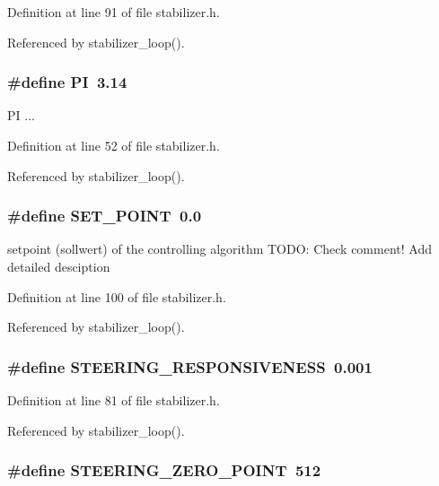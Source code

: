 Definition at line 91 of file stabilizer.h.

Referenced by stabilizer\_\-loop().
\subsubsection{\setlength{\rightskip}{0pt plus 5cm}\#define PI~3.14}\label{stabilizer_8h_598a3330b3c21701223ee0ca14316eca}


PI ... 

Definition at line 52 of file stabilizer.h.

Referenced by stabilizer\_\-loop().
\subsubsection{\setlength{\rightskip}{0pt plus 5cm}\#define SET\_\-POINT~0.0}\label{stabilizer_8h_513c42d8dbcacf9f9f7dde6914a496f5}


setpoint (sollwert) of the controlling algorithm TODO: Check comment! Add detailed desciption 

Definition at line 100 of file stabilizer.h.

Referenced by stabilizer\_\-loop().
\subsubsection{\setlength{\rightskip}{0pt plus 5cm}\#define STEERING\_\-RESPONSIVENESS~0.001}\label{stabilizer_8h_8366037faafd04166b46051a38ad1586}




Definition at line 81 of file stabilizer.h.

Referenced by stabilizer\_\-loop().
\subsubsection{\setlength{\rightskip}{0pt plus 5cm}\#define STEERING\_\-ZERO\_\-POINT~512}\label{stabilizer_8h_a49e35e5eba9ca864421e9019238d346}


